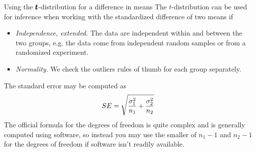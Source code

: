

\begin{onebox}{Using the
    $\pmb{\MakeLowercase{t}}$-distribution
    for a difference in means}
  \label{ConditionsForTwoSampleTDist}%
  The $t$-distribution can be used for inference when working
  with the standardized difference of two means if
  \begin{itemize}
  \setlength{\itemsep}{0mm}
  \item \emph{Independence, extended.}
    The data are independent within and between
    the two groups, e.g. the data come from
    independent random samples or from a
    randomized experiment.
  \item \emph{Normality.}
    We check the outliers rules of thumb for
    each group separately.
  \end{itemize}
  The standard error may be computed as
  \begin{align*}
  SE%
    = \sqrt{\frac{\sigma_1^2}{n_1} + \frac{\sigma_2^2}{n_2}}
  \index{standard error (SE)!difference in means}
  \end{align*}
  The official formula for the degrees of freedom is quite
  complex %
  and is generally computed using software,
  so instead you may use the smaller of
  $n_1 - 1$ and $n_2 - 1$ for the degrees of freedom
  if software isn't readily available.
\end{onebox}


